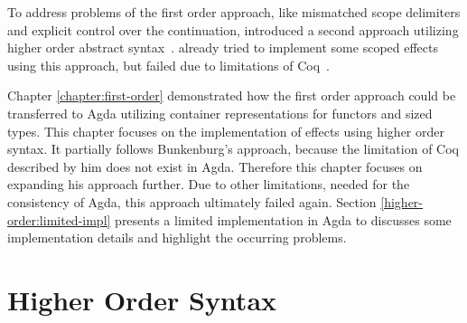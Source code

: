 
To address problems of the first order approach, like mismatched scope
delimiters and explicit control over the continuation,
\citeauthor{DBLP:conf/haskell/WuSH14} introduced a second approach utilizing
higher order abstract syntax~\cite{DBLP:conf/haskell/WuSH14}.
\citeauthor{bunkenburg2019modeling} already tried to implement some scoped
effects using this approach, but failed due to limitations of
Coq~\cite{bunkenburg2019modeling}.

Chapter \ref{chapter:first-order} demonstrated how the first order approach
could be transferred to Agda utilizing container representations for functors
and sized types.
This chapter focuses on the implementation of effects using higher order syntax.
It partially follows Bunkenburg's approach, because the limitation of Coq
described by him does not exist in Agda.
Therefore this chapter focuses on expanding his approach further.
Due to other limitations, needed for the consistency of Agda, this approach
ultimately failed again.
Section \ref{higher-order:limited-impl} presents a limited implementation in
Agda to discusses some implementation details and highlight the occurring
problems.


\section{Higher Order Syntax}
\label{higher-order:syntax}

